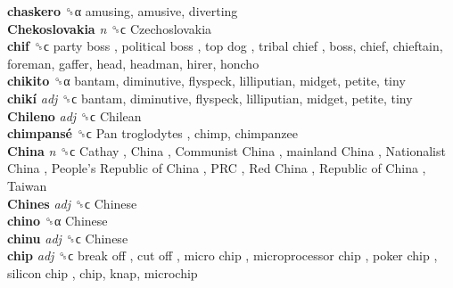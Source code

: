 \textbf{chaskero} ␝α  amusing, amusive, diverting  \\
\textbf{Chekoslovakia} \emph{n}  ␝ϲ   Czechoslovakia   \\
\textbf{chif} ␝ϲ   party boss ,  political boss ,  top dog ,  tribal chief , boss, chief, chieftain, foreman, gaffer, head, headman, hirer, honcho  \\
\textbf{chikito} ␝α  bantam, diminutive, flyspeck, lilliputian, midget, petite, tiny  \\
\textbf{chikí} \emph{adj}  ␝ϲ  bantam, diminutive, flyspeck, lilliputian, midget, petite, tiny  \\
\textbf{Chileno} \emph{adj}  ␝ϲ   Chilean   \\
\textbf{chimpansé} ␝ϲ   Pan troglodytes , chimp, chimpanzee  \\
\textbf{China} \emph{n}  ␝ϲ   Cathay ,  China ,  Communist China ,  mainland China ,  Nationalist China ,  People’s Republic of China ,  PRC ,  Red China ,  Republic of China ,  Taiwan   \\
\textbf{Chines} \emph{adj}  ␝ϲ   Chinese   \\
\textbf{chino} ␝α   Chinese   \\
\textbf{chinu} \emph{adj}  ␝ϲ   Chinese   \\
\textbf{chip} \emph{adj}  ␝ϲ   break off ,  cut off ,  micro chip ,  microprocessor chip ,  poker chip ,  silicon chip , chip, knap, microchip  \\
